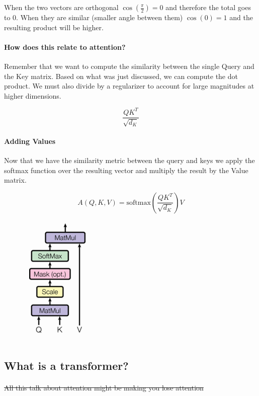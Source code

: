 \documentclass{article}
\begin{document}
    When the two vectors are orthogonal $\cos(\frac{\pi}{2}) = 0$ and therefore the total goes to 0.
    When they are similar (smaller angle between them) $\cos(0) = 1$ and the resulting product will be higher.

    \paragraph{How does this relate to attention?} Remember that we want to compute the similarity between the single Query and the Key matrix. Based on what was just discussed, we can compute the dot product. We must also divide by a regularizer to account for large magnitudes at higher dimensions.

    \[ \frac{QK^T}{\sqrt{d_K}} \]

    \paragraph{Adding Values} Now that we have the similarity metric between the query and keys we apply the softmax function over the resulting vector and multiply the result by the Value matrix.

    \[ A(Q,K,V) = \text{softmax} \left ( \frac{QK^T}{\sqrt{d_K}} \right) V \]

    \begin{center}
        \includegraphics[scale=0.5]{fig3.png}
    \end{center}

    \subsection{What is a transformer?}
    \paragraph{} \sout{All this talk about attention might be making you lose attention}
\end{document}
